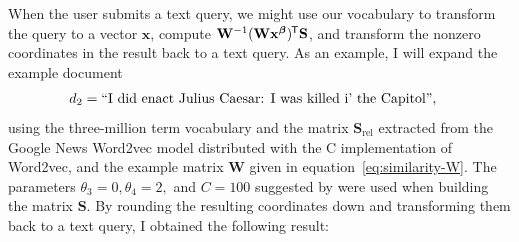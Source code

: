 \documentclass[
  digital, %
  notable, %
  lof,     %
  lot,     %
  nopalatino, color
]{fithesis3}
\newcommand*{\tran}{^{\mkern-1.5mu\mathsf{T}}}
\begin{document}
When the user submits a text query, we might use our vocabulary to transform the
query to a vector $\mathbf x$, compute $\mathbf W^{-1}(\mathbf W\mathbf
x^{\bm\beta})\tran\mathbf S$, and transform the nonzero coordinates in the
result back to a text query. As an example, I will expand the example document
\begin{align*}
  d_2 &=\text{``I did enact Julius Caesar: I was killed i' the Capitol''},\index{.d2@$d_2$}
\end{align*}
using the three-million term vocabulary and the matrix $\mathbf S_{\textrm{rel}}$%
 extracted from the Google News
Word2vec model distributed with the C implementation of
Word2vec, and the example matrix $\mathbf W$ given in
equation~\ref{eq:similarity-W}. The parameters
$\theta_3=0,\theta_4=2,$ and
$C=100$ suggested by \textcite{charletdamnati17} were used when
building the matrix $\mathbf S$. By rounding the
resulting coordinates down and transforming them back to a text query, I
obtained the following result:
\begingroup
\allowdisplaybreaks
\end{document}

